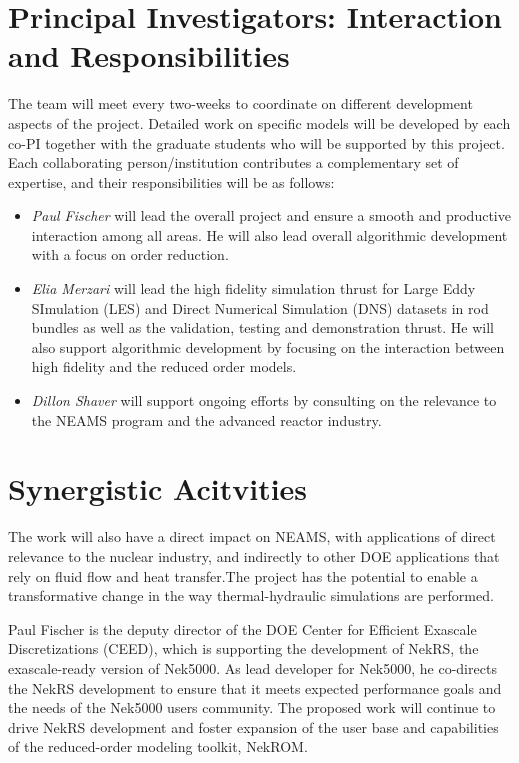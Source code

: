 \section{Principal Investigators: Interaction and Responsibilities}

The team will meet every two-weeks to coordinate on different development
aspects of the project. Detailed work on specific models will be developed by
each co-PI together with the graduate students who will be supported by this
project. Each collaborating person/institution contributes a complementary set
of expertise, and their responsibilities will be as follows: 
\begin{itemize}
    \item \textit{Paul  Fischer} will  lead the overall project and ensure a
smooth and productive interaction among all areas. He will also lead overall
algorithmic development with a focus on order reduction.  
\item \textit{Elia Merzari} will lead the high fidelity simulation thrust
for Large Eddy SImulation (LES) and Direct Numerical Simulation (DNS) datasets
in rod bundles as well as the validation, testing and demonstration thrust. He
will also support algorithmic development by focusing on the interaction
between high fidelity and the reduced order models.  

\item \textit{Dillon
Shaver} will support ongoing efforts by consulting on
the relevance to the NEAMS program and the advanced reactor industry.
\end{itemize}
\section{Synergistic Acitvities}
The work will also have a direct impact on NEAMS, with applications of direct
relevance to the nuclear industry, and indirectly to other DOE applications
that rely on fluid flow and heat transfer.The project has the potential to
enable a transformative change in the way thermal-hydraulic simulations are
performed.

Paul Fischer is the deputy director of the DOE Center for Efficient Exascale
Discretizations (CEED), which is supporting the development of NekRS,
the exascale-ready version of Nek5000.  As lead developer for Nek5000, he
co-directs the NekRS development to ensure that it meets expected performance
goals and the needs of the Nek5000 users community.  The proposed work will
continue to drive NekRS development and foster expansion of the user base
and capabilities of the reduced-order modeling toolkit, NekROM.

